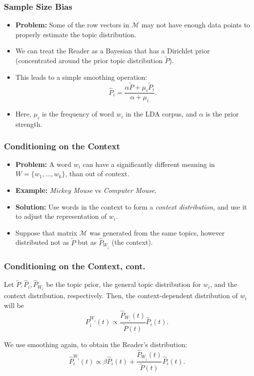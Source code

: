 \documentclass{beamer}
\newcommand\bet{\begin{Theorem}}
\newcommand\eet{\end{Theorem}}
\newcommand\bed{\begin{Definition}}
\newcommand\eed{\end{Definition}}
\newcommand\cM{{\mathcal M}}
\begin{document}
\begin{frame}
\frametitle{Sample Size Bias}
\begin{itemize}
\item {\bf Problem:} Some of the row vectors in $\cM$ may not have
  enough data points to properly estimate the topic distribution.
\item We can treat the Reader as a Bayesian that has a Dirichlet
  prior (concentrated around the prior topic distribution
  $\tilde{P}$). 
\item This leads to a simple smoothing operation:
\begin{equation}
\widehat{P}_i=\frac{\alpha \tilde{P}+ \mu_i \tilde{P}_i}{\alpha+\mu_i}.
\end{equation}
\item Here, $\mu_i$ is the frequency of word $w_i$ in the LDA corpus,
  and $\alpha$ is the prior strength.
\end{itemize}
\end{frame}

\begin{frame}
\frametitle{Conditioning on the Context}
\begin{itemize}
 \item {\bf Problem:} A word $w_i$ can have a significantly different
   meaning in $W=\{w_1,...,w_k\}$, than out of context.
\item {\bf Example:} {\it Mickey Mouse} vs {\it Computer Mouse}.
\item {\bf Solution:} Use words in the context to form a {\em context
    distribution}, and use it to adjust the representation of $w_i$.
\item Suppose that matrix $\cM$ was generated from the same topics, however
  distributed not as $\tilde{P}$ but as
  $\widehat{P}_{W_{\bar{i}}}$ (the context).
\end{itemize}
\end{frame}

\begin{frame}
\frametitle{Conditioning on the Context, cont.}
\bet
Let $\tilde{P},\widehat{P}_{i}, \widehat{P}_{W_{\bar{i}}}$ be the
topic prior, the general
topic distribution for $w_i$, and the context distribution,
respectively. Then, the context-dependent distribution of $w_i$ will
be 
\vspace{-2mm}
\begin{equation*}
P^{W_{\bar{i}}}_{i}(t)\propto \frac{\widehat{P}_{W_{\bar{i}}}(t)}{\tilde{P}(t)}\widehat{P}_{i}(t).
\end{equation*}
\eet
\bed
We use smoothing again, to obtain the Reader's distribution:
\vspace{-2mm}
\[\widehat{P}^{W_{\bar{i}}}_{i}(t)\propto \beta \widehat{P}_{i}\!(t)
+\frac{\widehat{P}_{W_{\bar{i}}}(t)}{\tilde{P}(t)}\widehat{P}_{i}(t).\] 
\eed
\end{frame}
\end{document}

